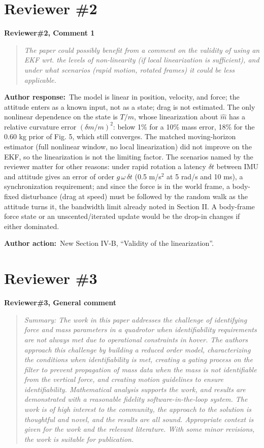 \documentclass[11pt]{article}
\newcommand{\concern}[1]{\par\medskip\noindent\colorbox{gray!12}{\parbox{\dimexpr\linewidth-2\fboxsep}{\textbf{#1}}}\par\smallskip}
\newcommand{\rlabel}[1]{\par\textbf{#1}\ }
\begin{document}
\section*{Reviewer \#2}

\concern{Reviewer\#2, Comment 1}

\begin{quote}\itshape The paper could possibly benefit from a comment on the validity of using an EKF wrt. the levels of non-linearity (if local linearization is sufficient), and under what scenarios (rapid motion, rotated frames) it could be less applicable.\end{quote}

\rlabel{Author response:}The model is linear in position, velocity, and force; the attitude enters as a known input, not as a state; drag is not estimated. The only nonlinear dependence on the state is $T/m$, whose linearization about $\hat m$ has a relative curvature error $(\delta m/m)^2$: below 1\% for a 10\% mass error, 18\% for the 0.60 kg prior of Fig. 5, which still converges. The matched moving-horizon estimator (full nonlinear window, no local linearization) did not improve on the EKF, so the linearization is not the limiting factor. The scenarios named by the reviewer matter for other reasons: under rapid rotation a latency $\delta t$ between IMU and attitude gives an error of order $g\,\omega\,\delta t$ (0.5 m/s$^2$ at 5 rad/s and 10 ms), a synchronization requirement; and since the force is in the world frame, a body-fixed disturbance (drag at speed) must be followed by the random walk as the attitude turns it, the bandwidth limit already noted in Section II. A body-frame force state or an unscented/iterated update would be the drop-in changes if either dominated.

\rlabel{Author action:}New Section IV-B, ``Validity of the linearization''.

\section*{Reviewer \#3}

\concern{Reviewer\#3, General comment}

\begin{quote}\itshape Summary: The work in this paper addresses the challenge of identifying force and mass parameters in a quadrotor when identifiability requirements are not always met due to operational constraints in hover. The authors approach this challenge by building a reduced order model, characterizing the conditions when identifiability is met, creating a gating process on the filter to prevent propagation of mass data when the mass is not identifiable from the vertical force, and creating motion guidelines to ensure identifiability. Mathematical analysis supports the work, and results are demonstrated with a reasonable fidelity software-in-the-loop system. The work is of high interest to the community, the approach to the solution is thoughtful and novel, and the results are all sound. Appropriate context is given for the work and the relevant literature. With some minor revisions, the work is suitable for publication.\end{quote}
\end{document}
